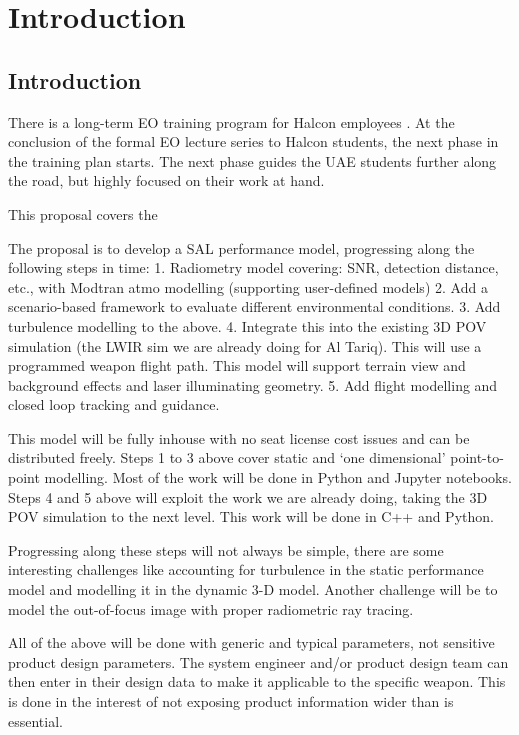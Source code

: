 
\chapter{Introduction}
\label{chap:Introduction}


\section{Introduction}

There is a long-term \ac{EO} training program for Halcon employees \cite{willershalcontraining2021}.
At the conclusion of the formal \ac{EO} lecture series to Halcon students, the next phase in the training plan starts.
The next phase guides the UAE students further along the road, but highly focused on their work at hand.

This proposal covers the 


The proposal is to develop a SAL performance model, progressing along the following steps in time:
1.	Radiometry model covering: SNR, detection distance, etc., with Modtran atmo modelling (supporting user-defined models)
2.	Add a scenario-based framework to evaluate different environmental conditions.
3.	Add turbulence modelling to the above.
4.	Integrate this into the existing 3D POV simulation (the LWIR sim we are already doing for Al Tariq). This will use a programmed weapon flight path. This model will support terrain view and background effects and laser illuminating geometry.
5.	Add flight modelling and closed loop tracking and guidance.

This model will be fully inhouse with no seat license cost issues and can be distributed freely.
Steps 1 to 3 above cover static and `one dimensional' point-to-point modelling. Most of the work will be done in Python and Jupyter notebooks.
Steps 4 and 5 above will exploit the work we are already doing, taking the 3D POV simulation to the next level. This work will be done in C++ and Python.

Progressing along these steps will not always be simple, there are some interesting challenges like accounting for turbulence in the static performance model and modelling it in the dynamic 3-D model.  Another challenge will be to model the out-of-focus image with proper radiometric ray tracing.

All of the above will be done with generic and typical parameters, not sensitive product design parameters.
The system engineer and/or product design team can then enter in their design data to make it applicable to the specific weapon.
This is done in the interest of not exposing product information wider than is essential.


